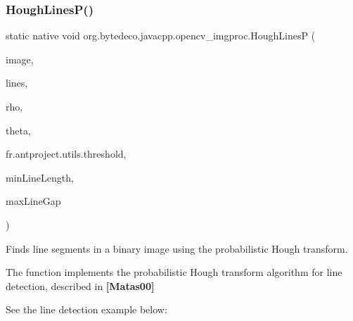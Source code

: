 \subsubsection{\texorpdfstring{Hough\+Lines\+P()}{HoughLinesP()}}
{\footnotesize\ttfamily static native void org.\+bytedeco.\+javacpp.\+opencv\+\_\+imgproc.\+Hough\+LinesP (\begin{DoxyParamCaption}\item[{@By\+Val Mat}]{image,  }\item[{@By\+Val Mat}]{lines,  }\item[{double}]{rho,  }\item[{double}]{theta,  }\item[{int}]{fr.antproject.utils.threshold,  }\item[{double}]{min\+Line\+Length,  }\item[{double}]{max\+Line\+Gap }\end{DoxyParamCaption})\hspace{0.3cm}{\ttfamily [static]}}



Finds line segments in a binary image using the probabilistic Hough transform. 

The function implements the probabilistic Hough transform algorithm for line detection, described in {\bfseries [Matas00]} 

See the line detection example below\+: 


